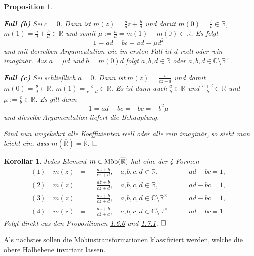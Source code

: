 \documentclass[11pt]{book}
\numberwithin{dummy}{section}
\newtheorem{proposition}[theorem]{Proposition}
\newtheorem{corollary}[theorem]{Korollar}
\theoremstyle{nonumberbreak}
\newenvironment{pr}[1][]{\ifthenelse{\equal{#1}{}}{\proof}{\proof[#1]}\rm}{\endproof}
\newcommand{\C}{\mathbb{C}}
\newcommand{\R}{\mathbb{R}}
\newcommand{\RR}{\overline{\mathbb{R}}}
\newcommand{\amobr}{\textup{Möb}(\overline{\mathbb{R}})}
\begin{document}
\begin{spacing}{1.4}
\begin{proposition}
\begin{pr}
\begin{compactenum}
\item[\textbf{Fall (b)}] Sei $c=0$. Dann ist $m(z)= \frac{a}{d} z + \frac{b}{d}$ und damit $m(0) = \frac{b}{d} \in \R$, $m(1) = \frac{a}{d} + \frac{b}{d} \in \R$ und somit $\mu:= \frac{a}{d} = m(1)-m(0) \in \R$. Es folgt
$$1=ad-bc = ad = \mu d^{2}$$
und mit derselben Argumentation wie im ersten Fall ist $d$ reell oder rein imaginär. Aus $a = \mu d$ und $b = m(0) d$ folgt $a,b,d \in \R$ oder $a,b,d \in \C \setminus \R^{\times}$.
\item[\textbf{Fall (c)}] Sei schließlich $a=0$. Dann ist $m(z) = \frac{b}{cz+d}$ und damit $m(0) = \frac{b}{d} \in \R$, $m(1) = \frac{b}{c+d} \in \R$. Es ist dann auch $\frac{d}{b} \in \R$ und $\frac{c+d}{b} \in \R$ und $\mu:=\frac{c}{b} \in \R$. Es gilt dann 
$$1=ad-bc = -bc = -b^2 \mu$$
und dieselbe Argumentation liefert die Behauptung. 

\end{compactenum}
Sind nun umgekehrt alle Koeffizienten reell oder alle rein imaginär, so sieht man leicht ein, dass $m(\RR) = \RR$. $\hfill \Box$

\end{pr}

\end{proposition}


\hypertarget{coreinssiebenzwei}{}
\begin{corollary}
Jedes Element $m \in \amobr$ hat eine der 4 Formen 
\setlength{\abovedisplayskip}{5.5pt}
\setlength{\belowdisplayskip}{5.5pt}
\begin{alignat*}{5}
(1) \quad m(z) &=&& \frac{az+b}{cz+d}, \quad a,b,c,d \in \R, \quad &&ad-bc = 1,\\
(2) \quad m(z) &=&& \frac{a\overline{z}+b}{c\overline{z}+d}, \quad a,b,c,d \in \R, \quad &&ad-bc = 1,\\
(3) \quad m(z) &=&& \frac{az+b}{cz+d}, \quad a,b,c,d \in \C \setminus \R^{\times}, \quad &&ad-bc = 1,\\
(4) \quad m(z) &=&& \frac{a \overline{z} +b}{c \overline{z} +d}, \quad a,b,c,d \in \C \setminus \R^{\times}, \quad &&ad-bc = 1.
\end{alignat*}
\begin{pr}
Folgt direkt aus den Propositionen \hyperlink{propeinssechssechs}{1.6.6} und \hyperlink{propeinssiebeneins}{1.7.1}. $\hfill \Box$

\end{pr}
\end{corollary}



Als nächstes sollen die Möbiustransformationen klassifiziert werden, welche die obere Halbebene invariant lassen.



\end{spacing}
\end{document}
